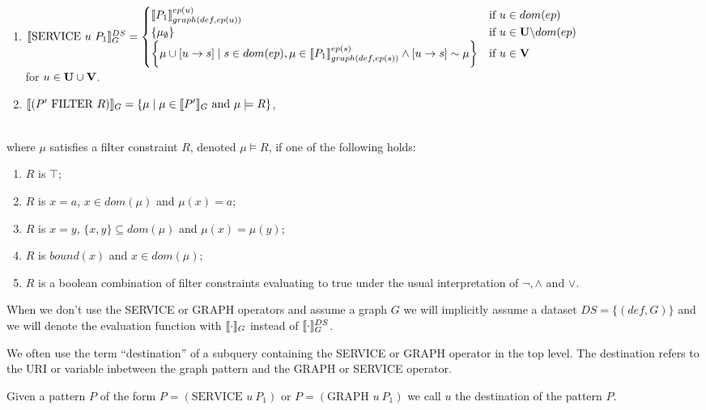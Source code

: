 \begin{definition}
{{\begin{enumerate}
					\item $\llbracket \mbox{SERVICE } u \ P_1 \rrbracket_G^{DS}  = 
						\begin{cases} 
							\llbracket P_1\rrbracket_{graph(def,ep(u))}^{ep(u)} &\mbox{if } u \in dom(ep)\\	
							\{ \mu_\emptyset\} & \mbox{if } u \in \mathbf{U} \backslash dom(ep)\\
							\bigg\{\mu \cup [u \rightarrow s ] \mid s \in dom(ep), \mu
								\in \llbracket P_1 \rrbracket^{ep(s)}_{graph(def,ep(s))} \land [u \rightarrow s ] \sim \mu
							\bigg\}			   & \mbox{if } u \in \mathbf{V}
							\end{cases}$\\ 
							for $u \in \mathbf{U} \cup \mathbf{V}$.
				\item $\llbracket (P' \mbox{ FILTER } R) \rrbracket_G = \{ \mu \mid \mu \in \llbracket P'
					\rrbracket_G \mbox{ and } \mu \models R \}$,
					\end{enumerate}
				}
			}\\
		where $\mu$ satisfies a filter constraint $R$, denoted $\mu \models R$,
		if one of the following holds:
		\begin{enumerate}
			\item $R$ is $\top$;
			\item $R$ is $x = a$, $x \in dom(\mu)$ and $\mu(x) = a$;
			\item $R$ is $x = y$, $\{x,y\} \subseteq dom(\mu)$ and $\mu(x) =
				\mu(y)$;
			\item $R$ is $bound(x)$ and $x \in dom(\mu)$;
			\item $R$ is a boolean combination of filter constraints evaluating
				to true under the usual interpretation of $\neg,\land$ and
				$\lor$.
		\end{enumerate}
		\end{definition}

		When we don't use the SERVICE or GRAPH operators and assume a graph $G$
		we will implicitly assume a dataset $DS = \{(def,G)\}$ and
		we will denote the evaluation function with $\llbracket \cdot \rrbracket_G$ instead
		of $\llbracket \cdot \rrbracket^{DS}_G$.

		We often use the term ``destination'' of a subquery containing the SERVICE or
		GRAPH operator in the top level.
		The destination refers to the URI or variable inbetween the graph
		pattern and the GRAPH or SERVICE operator.

		\begin{definition}
			Given a pattern $P$ of the form $P = (\mbox{SERVICE } u \ P_1)$ or
			$P	= (\mbox{GRAPH } u \ P_1)$ we call $u$ the
			destination of the pattern $P$.
		\end{definition}

